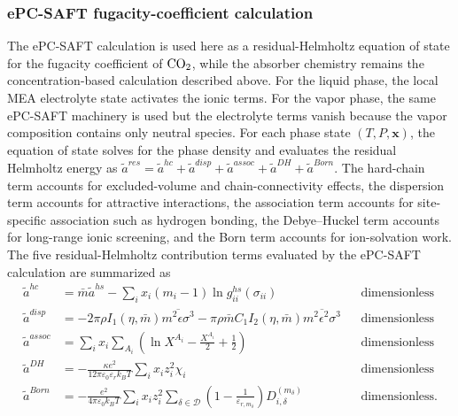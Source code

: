                 \subsubsection*{ePC-SAFT fugacity-coefficient calculation}
                The ePC-SAFT calculation is used here as a residual-Helmholtz equation of state for the fugacity coefficient of $\COtwo$, while the absorber chemistry remains the concentration-based calculation described above. For the liquid phase, the local MEA electrolyte state activates the ionic terms. For the vapor phase, the same ePC-SAFT machinery is used but the electrolyte terms vanish because the vapor composition contains only neutral species. For each phase state $(T,P,\mathbf{x})$, the equation of state solves for the phase density and evaluates the residual Helmholtz energy as $\tilde{a}^{res}=\tilde{a}^{hc}+\tilde{a}^{disp}+\tilde{a}^{assoc}+\tilde{a}^{DH}+\tilde{a}^{Born}$. The hard-chain term accounts for excluded-volume and chain-connectivity effects, the dispersion term accounts for attractive interactions, the association term accounts for site-specific association such as hydrogen bonding, the Debye--Huckel term accounts for long-range ionic screening, and the Born term accounts for ion-solvation work. The five residual-Helmholtz contribution terms evaluated by the ePC-SAFT calculation are summarized as
                \begin{align}
                    \tilde{a}^{hc}
                    &= \bar{m}\tilde{a}^{hs}
                    -\sum_i x_i(m_i-1)\ln g_{ii}^{hs}(\sigma_{ii})
                    && \text{dimensionless}\label{eq:epcsaft-hc}\\
                    \tilde{a}^{disp}
                    &= -2\pi\rho I_1(\eta,\bar{m})\overline{m^2\epsilon\sigma^3}
                    -\pi\rho\bar{m}C_1I_2(\eta,\bar{m})\overline{m^2\epsilon^2\sigma^3}
                    && \text{dimensionless}\label{eq:epcsaft-disp}\\
                    \tilde{a}^{assoc}
                    &= \sum_i x_i\sum_{A_i}
                    \left(\ln X^{A_i}-\frac{X^{A_i}}{2}+\frac{1}{2}\right)
                    && \text{dimensionless}\label{eq:epcsaft-assoc}\\
                    \tilde{a}^{DH}
                    &=-\frac{\kappa e^{2}}{12\pi\varepsilon_{0}\varepsilon_{r}k_{B}T}
                    \sum_i x_i z_i^2 \chi_i
                    && \text{dimensionless}\label{eq:epcsaft-dh}\\
                    \tilde{a}^{Born}
                    &=
                    -\frac{e^2}{4\pi\varepsilon_0 k_B T}
                    \sum_i x_i z_i^2
                    \sum_{\delta\in\mathcal{D}}
                    \left(1-\frac{1}{\varepsilon_{r,m_\delta}}\right)
                    D_{i,\delta}^{(m_\delta)}
                    && \text{dimensionless}\label{eq:epcsaft-born}.
                \end{align}
